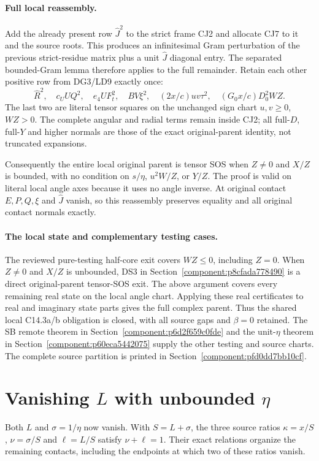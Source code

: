 \paragraph{Full local reassembly.}
Add the already present row $\widehat J^2$ to the strict frame
CJ2 and allocate CJ7 to it and the source roots.  This produces an
infinitesimal Gram perturbation of the previous strict-residue
matrix plus a unit $\widehat J$ diagonal entry.  The separated
bounded-Gram lemma therefore applies to the full remainder.
Retain each other positive row from DG3/LD9 exactly once:
\[
 \widehat R^2,\quad c_UUQ^2,\quad e_4UF_t^2,\quad BV\xi^2,
 \quad(2x/c)uv\tau^2,\quad(G_0x/c)D_0^2WZ.
\]
The last two are literal tensor squares on the unchanged sign chart
$u,v\ge0$, $WZ>0$.  The complete angular and radial terms remain
inside CJ2; all full-$D$, full-$Y$ and higher normals are those of
the exact original-parent identity, not truncated expansions.

Consequently the entire local original parent is tensor SOS when
$Z\ne0$ and $X/Z$ is bounded, with no condition on $s/\eta$,
$u^2W/Z$, or $Y/Z$.  The proof is valid on literal local angle axes
because it uses no angle inverse.  At original contact $E,P,Q,\xi$
and $\widehat J$ vanish, so this reassembly preserves equality and
all original contact normals exactly.

\paragraph{The local state and complementary testing cases.}
The reviewed pure-testing half-core exit covers $WZ\le0$, including
$Z=0$.  When $Z\ne0$ and $X/Z$ is unbounded, DS3 in Section~\ref{component:p8cfada778490} is a direct
original-parent tensor-SOS exit.  The above argument covers every
remaining real state on the local angle chart.  Applying these real
certificates to real and imaginary state parts gives the full complex
parent.  Thus the shared local C14.3a/b obligation is closed, with
all source gaps and $\beta=0$ retained.  The SB remote theorem in Section~\ref{component:p6d2f659c0fde} and the unit-$\eta$ theorem in Section~\ref{component:p60eca5442075} supply the other testing and source charts. The complete source partition is printed in Section~\ref{component:pfd0dd7bb10cf}.



\section{Vanishing $L$ with unbounded \texorpdfstring{$\eta$}{eta}}
Both $L$ and $\sigma=1/\eta$ now vanish. With $S=L+\sigma$, the three source ratios $\kappa=x/S$, $\nu=\sigma/S$ and $\ell=L/S$ satisfy $\nu+\ell=1$. Their exact relations organize the remaining contacts, including the endpoints at which two of these ratios vanish.

